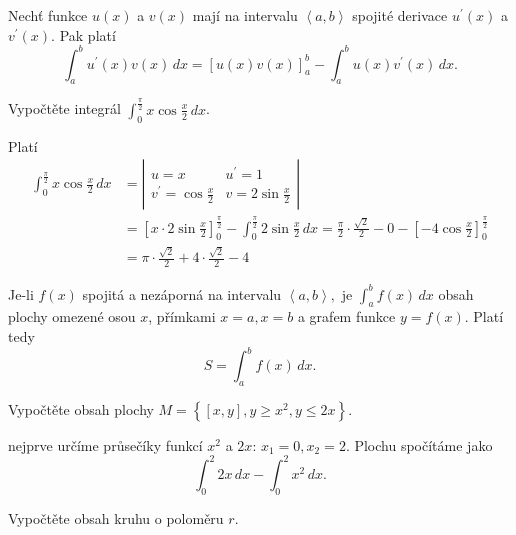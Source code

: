 \begin{veta}
Nechť funkce $u(x)$ a $v(x)$ mají na intervalu $\left < a,b \right > $ spojité derivace
$u^\prime (x)$ a $v^\prime (x)$. Pak platí
$$\int_a ^b u^\prime (x)v(x)\, dx = \left [ u(x)v(x) \right ]_a^b -\int _a^b u(x)v^\prime(x)\,dx.$$
\end{veta}

\begin{priklad}
Vypočtěte integrál $\int _0^{\frac{\pi}{2}}x \cos \frac{x}{2}\, dx$.
\end{priklad}

\begin{reseni}
Platí
\begin{align*}
\int _0^{\frac{\pi}{2}}x \cos \frac{x}{2}\, dx &= \left | \begin{array}{ll}
    u=x & u^\prime = 1 \\
    v^\prime = \cos \frac{x}{2} & v = 2\sin \frac{x}{2}
\end{array}   \right | \\
& =\left [ x\cdot2\sin \frac{x}{2} \right ]_0^{\frac{\pi}{2}}-\int_0^{\frac{\pi}{2}}2\sin \frac{x}{2}\, dx =\frac{\pi}{2}\cdot \frac{\sqrt{2} }{2}-0-\left [ -4\cos \frac{x}{2} \right ]_0^{\frac{\pi}{2}}\\
&= \pi \cdot \frac{\sqrt{2} }{2}+4\cdot \frac{\sqrt{2} }{2}-4
\end{align*}
\end{reseni}

\begin{pozn}
    Je-li $f(x)$ spojitá a nezáporná na intervalu $\left < a,b \right > ,$ je
    $\int_a ^b f(x)\, dx$ obsah plochy omezené osou $x$, přímkami $x=a, x=b$ a
    grafem funkce $y=f(x)$. Platí tedy
    $$S=\int_a^b f(x)\, dx.$$
\end{pozn}

\begin{priklad}
Vypočtěte obsah plochy $M=\left \{ [x,y], y \geq  x^2 , y \leq 2x\right \} $.
\end{priklad}

\begin{reseni}
nejprve určíme průsečíky funkcí $x^2$ a $2x$: $x_1=0,x_2=2$. Plochu spočítáme
jako
$$\int_0^2 2x\, dx - \int_0^2 x^2 \, dx.$$
\end{reseni}

\begin{priklad}
Vypočtěte obsah kruhu o poloměru $r$.
\end{priklad}

